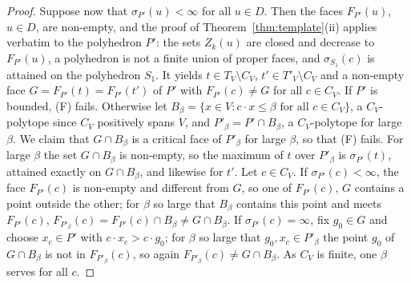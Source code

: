 \documentclass[11pt]{amsart}
\theoremstyle{definition}
\begin{document}
\begin{proof}
Suppose now that $\sigma_{P'}(u)<\infty$ for all $u\in D$. Then the
faces $F_{P'}(u)$, $u\in D$, are non-empty, and the proof of
Theorem~\ref{thm:template}(ii) applies verbatim to the polyhedron $P'$:
the sets $Z_k(u)$ are closed and decrease to $F_{P'}(u)$, a polyhedron
is not a finite union of proper faces, and $\sigma_{S_1}(c)$ is
attained on the polyhedron $S_1$. It yields $t\in T_V\setminus C_V$,
$t'\in T'_V\setminus C_V$ and a non-empty face $G=F_{P'}(t)=F_{P'}(t')$
of $P'$ with $F_{P'}(c)\ne G$ for all $c\in C_V$. If $P'$ is bounded,
(F) fails. Otherwise let $B_\beta=\{x\in V:c\cdot x\le\beta\text{ for
all }c\in C_V\}$, a $C_V$-polytope since $C_V$ positively spans $V$, and
$P'_\beta=P'\cap B_\beta$, a $C_V$-polytope for large $\beta$. We claim
that $G\cap B_\beta$ is a critical face of $P'_\beta$ for large
$\beta$, so that (F) fails. For large $\beta$ the set $G\cap B_\beta$
is non-empty, so the maximum of $t$ over $P'_\beta$ is $\sigma_{P'}(t)$,
attained exactly on $G\cap B_\beta$, and likewise for $t'$. Let $c\in
C_V$. If $\sigma_{P'}(c)<\infty$, the face $F_{P'}(c)$ is non-empty and
different from $G$, so one of $F_{P'}(c)$, $G$ contains a point outside
the other; for $\beta$ so large that $B_\beta$ contains this point and
meets $F_{P'}(c)$, $F_{P'_\beta}(c)=F_{P'}(c)\cap B_\beta\ne G\cap
B_\beta$. If $\sigma_{P'}(c)=\infty$, fix $g_0\in G$ and choose $x_c\in P'$
with $c\cdot x_c>c\cdot g_0$; for $\beta$ so large that $g_0,x_c\in
P'_\beta$ the point $g_0$ of $G\cap B_\beta$ is not in $F_{P'_\beta}
(c)$, so again $F_{P'_\beta}(c)\ne G\cap B_\beta$. As $C_V$ is finite,
one $\beta$ serves for all $c$.
\end{proof}
\end{document}
